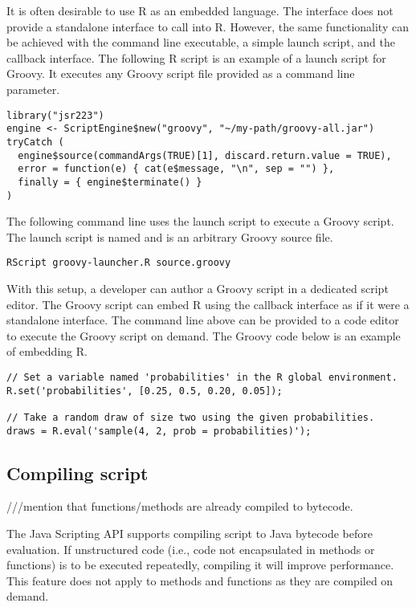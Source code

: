 It is often desirable to use R as an embedded language. The  interface does not provide a standalone interface to call into R. However, the same functionality can be achieved with the  command line executable, a simple launch script, and the  callback interface. The following R script is an example of a launch script for Groovy. It executes any Groovy script file provided as a command line parameter.

\begin{verbatim}
library("jsr223")
engine <- ScriptEngine$new("groovy", "~/my-path/groovy-all.jar")
tryCatch (
  engine$source(commandArgs(TRUE)[1], discard.return.value = TRUE),
  error = function(e) { cat(e$message, "\n", sep = "") },
  finally = { engine$terminate() }
)
\end{verbatim}

The following command line uses the launch script to execute a Groovy script. The launch script is named  and  is an arbitrary Groovy source file.

\begin{verbatim}
RScript groovy-launcher.R source.groovy
\end{verbatim}

With this setup, a developer can author a Groovy script in a dedicated script editor. The Groovy script can embed R using the  callback interface as if it were a standalone interface. The command line above can be provided to a code editor to execute the Groovy script on demand. The Groovy code below is an example of embedding R.

\begin{verbatim}
// Set a variable named 'probabilities' in the R global environment.
R.set('probabilities', [0.25, 0.5, 0.20, 0.05]);

// Take a random draw of size two using the given probabilities.
draws = R.eval('sample(4, 2, prob = probabilities)');
\end{verbatim}

\subsection{Compiling script}

///mention that functions/methods are already compiled to bytecode.

The Java Scripting API supports compiling script to Java bytecode before evaluation. If unstructured code (i.e., code not encapsulated in methods or functions) is to be executed repeatedly, compiling it will improve performance. This feature does not apply to methods and functions as they are compiled on demand.

